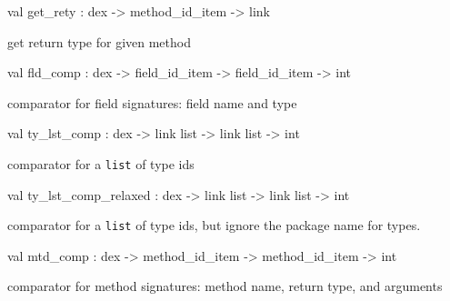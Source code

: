 \documentclass[11pt]{article}
\begin{document}
\label{val:Dex.get-underscorerety}\begin{ocamldoccode}
val get_rety : dex -> method_id_item -> link
\end{ocamldoccode}
\begin{ocamldocdescription}
get return type for given method


\end{ocamldocdescription}




\label{val:Dex.fld-underscorecomp}\begin{ocamldoccode}
val fld_comp : dex -> field_id_item -> field_id_item -> int
\end{ocamldoccode}
\begin{ocamldocdescription}
comparator for field signatures: field name and type


\end{ocamldocdescription}




\label{val:Dex.ty-underscorelst-underscorecomp}\begin{ocamldoccode}
val ty_lst_comp : dex -> link list -> link list -> int
\end{ocamldoccode}
\begin{ocamldocdescription}
comparator for a {\tt{list}} of type ids


\end{ocamldocdescription}




\label{val:Dex.ty-underscorelst-underscorecomp-underscorerelaxed}\begin{ocamldoccode}
val ty_lst_comp_relaxed : dex -> link list -> link list -> int
\end{ocamldoccode}
\begin{ocamldocdescription}
comparator for a {\tt{list}} of type ids,
  but ignore the package name for types.


\end{ocamldocdescription}




\label{val:Dex.mtd-underscorecomp}\begin{ocamldoccode}
val mtd_comp : dex -> method_id_item -> method_id_item -> int
\end{ocamldoccode}
\begin{ocamldocdescription}
comparator for method signatures: method name, return type, and arguments


\end{ocamldocdescription}
\end{document}
